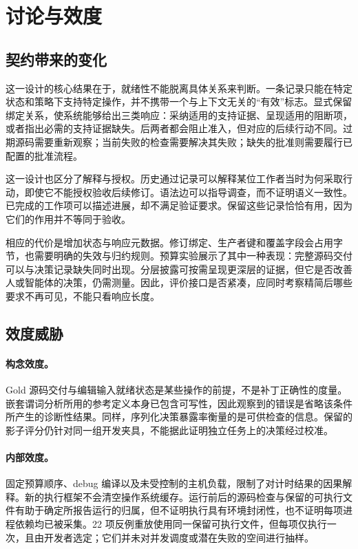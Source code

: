 \section{讨论与效度}
\label{sec:discussion}
\subsection{契约带来的变化}
这一设计的核心结果在于，就绪性不能脱离具体关系来判断。一条记录只能在特定状态和策略下支持特定操作，并不携带一个与上下文无关的“有效”标志。显式保留绑定关系，使系统能够给出三类响应：采纳适用的支持证据、呈现适用的阻断项，或者指出必需的支持证据缺失。后两者都会阻止准入，但对应的后续行动不同。过期源码需要重新观察；当前失败的检查需要解决其失败；缺失的批准则需要履行已配置的批准流程。

这一设计也区分了解释与授权。历史通过记录可以解释某位工作者当时为何采取行动，即使它不能授权验收后续修订。语法边可以指导调查，而不证明语义一致性。已完成的工作项可以描述进展，却不满足验证要求。保留这些记录恰恰有用，因为它们的作用并不等同于验收。

相应的代价是增加状态与响应元数据。修订绑定、生产者键和覆盖字段会占用字节，也需要明确的失效与归约规则。预算实验展示了其中一种表现：完整源码交付可以与决策记录缺失同时出现。分层披露可按需呈现更深层的证据，但它是否改善人或智能体的决策，仍需测量。因此，评价接口是否紧凑，应同时考察精简后哪些要求不再可见，不能只看响应长度。

\subsection{效度威胁}
\paragraph{构念效度。}
Gold 源码交付与编辑输入就绪状态是某些操作的前提，不是补丁正确性的度量。嵌套谓词分析所用的参考定义本身已包含可写性，因此观察到的错误是省略该条件所产生的诊断性结果。同样，序列化决策暴露率衡量的是可供检查的信息。保留的影子评分仍针对同一组开发夹具，不能据此证明独立任务上的决策经过校准。

\paragraph{内部效度。}
固定预算顺序、debug 编译以及未受控制的主机负载，限制了对计时结果的因果解释。新的执行框架不会清空操作系统缓存。运行前后的源码检查与保留的可执行文件有助于确定所报告运行的归属，但不证明执行具有环境封闭性，也不证明每项进程依赖均已被采集。22 项反例重放使用同一保留可执行文件，但每项仅执行一次，且由开发者选定；它们并未对并发调度或潜在失败的空间进行抽样。

